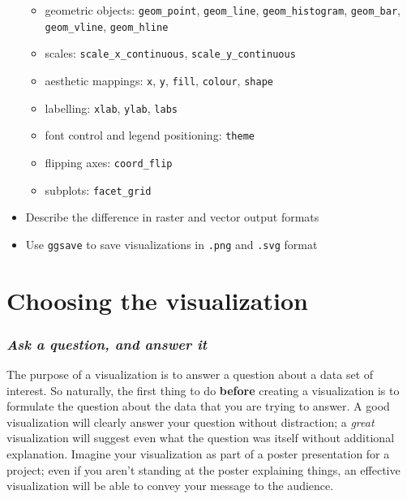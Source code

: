 \documentclass[
]{krantz}
\providecommand{\tightlist}{%
  \setlength{\itemsep}{0pt}\setlength{\parskip}{0pt}}
\begin{document}
\begin{itemize}
  \begin{itemize}
  \tightlist
  \item
    geometric objects: \texttt{geom\_point}, \texttt{geom\_line}, \texttt{geom\_histogram}, \texttt{geom\_bar}, \texttt{geom\_vline}, \texttt{geom\_hline}
  \item
    scales: \texttt{scale\_x\_continuous}, \texttt{scale\_y\_continuous}
  \item
    aesthetic mappings: \texttt{x}, \texttt{y}, \texttt{fill}, \texttt{colour}, \texttt{shape}
  \item
    labelling: \texttt{xlab}, \texttt{ylab}, \texttt{labs}
  \item
    font control and legend positioning: \texttt{theme}
  \item
    flipping axes: \texttt{coord\_flip}
  \item
    subplots: \texttt{facet\_grid}
  \end{itemize}
\item
  Describe the difference in raster and vector output formats
\item
  Use \texttt{ggsave} to save visualizations in \texttt{.png} and \texttt{.svg} format
\end{itemize}

\hypertarget{choosing-the-visualization}{%
\section{Choosing the visualization}\label{choosing-the-visualization}}

\hypertarget{ask-a-question-and-answer-it}{%
\subsubsection{\texorpdfstring{\emph{Ask a question, and answer it}}{Ask a question, and answer it}}\label{ask-a-question-and-answer-it}}

The purpose of a visualization is to answer a question about a data set of interest. So naturally, the first thing to do \textbf{before} creating
a visualization is to formulate the question about the data that you are trying to answer.
A good visualization will clearly answer your question without distraction; a \emph{great} visualization will suggest even what the question
was itself without additional explanation. Imagine your visualization as part of a poster presentation for a project; even if you aren't standing
at the poster explaining things, an effective visualization will be able to convey your message to the audience.
\end{document}
